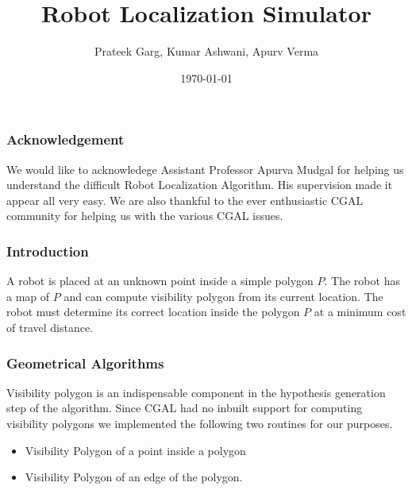 \documentclass{beamer}
\title{Robot Localization Simulator}
\author{ Prateek Garg, Kumar Ashwani, Apurv Verma }
\date {\today}
\begin{document}
\frame{\titlepage}

\frame
{
  \frametitle{Acknowledgement}
We would like to acknowledege Assistant Professor Apurva Mudgal for helping us understand the difficult Robot Localization Algorithm.
 His supervision made it appear all very easy.
 We are also thankful to the ever enthusiastic CGAL community for helping us with the various CGAL issues.


}

\frame
{
  \frametitle{Introduction}

A robot is placed at an unknown point inside a simple polygon $ P $. The robot has a map of 
$ P$ and can compute visibility polygon from its current location. The robot must determine its correct 
location inside the polygon $P $ at a minimum cost of travel distance.

}



\frame
{
  \frametitle{Geometrical Algorithms}

Visibility polygon is an indispensable component in the hypothesis generation step of the algorithm. Since CGAL had no inbuilt support
 for computing visibility polygons we implemented the following two routines for our purposes.
\begin{itemize}
 \item Visibility Polygon of a point inside a polygon
 \item Visibility Polygon of an edge of the polygon.
\end{itemize}

}
\end{document}

